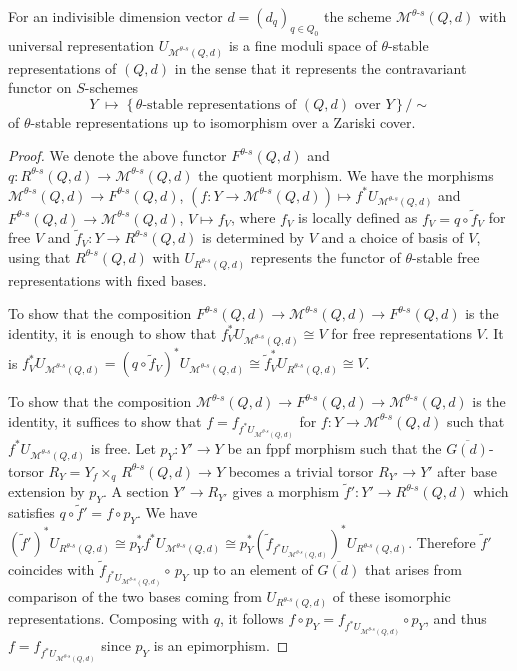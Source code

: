 \documentclass[ALCO,ThmDefs,Unicode,epreuves]{cedram}
\begin{document}
\begin{theo}\label{thm:modulireprquiver}
For an indivisible dimension vector $d=(d_q)_{q\in Q_0}$ the scheme 
$\mathcal M^{\theta\text{-}s}(Q,d)$ with universal representation 
$U_{\mathcal M^{\theta\text{-}s}(Q,d)}$ is a fine moduli space of $\theta$-stable 
representations of $(Q,d)$ in the sense that it represents the contravariant 
functor on $S$-schemes
\[
Y\;\mapsto\;
\big\{\text{$\,\theta$-stable representations of $(Q,d)$ over $Y\,$}\big\}\,/\!\sim
\]
of $\theta$-stable representations up to isomorphism over a Zariski cover.
\end{theo}
\begin{proof}
We denote the above functor $F^{\theta\text{-}s}(Q,d)$ and 
$q\colon R^{\theta\text{-}s}(Q,d)\to\mathcal M^{\theta\text{-}s}(Q,d)$
the quotient morphism.
We have the morphisms $\mathcal M^{\theta\text{-}s}(Q,d)\to 
F^{\theta\text{-}s}(Q,d)$, $(f\colon Y\to\mathcal M^{\theta\text{-}s}(Q,d))
\mapsto f^*U_{\mathcal M^{\theta\text{-}s}(Q,d)}$ 
and $F^{\theta\text{-}s}(Q,d)\to\mathcal M^{\theta\text{-}s}(Q,d)$,
$V\mapsto f_V$, where $f_V$ is locally defined as $f_V=q\circ\tilde{f}_V$ 
for free $V$ and $\tilde{f}_V\colon Y\to R^{\theta\text{-}s}(Q,d)$ is determined
by $V$ and a choice of basis of $V$, using that $R^{\theta\text{-}s}(Q,d)$ with
$U_{R^{\theta\text{-}s}(Q,d)}$ represents the functor of $\theta$-stable 
free representations with fixed bases.

To show that the composition 
$F^{\theta\text{-}s}(Q,d)\to\mathcal M^{\theta\text{-}s}(Q,d)
\to F^{\theta\text{-}s}(Q,d)$ is the identity, it is enough to show that 
$f_V^*U_{\mathcal M^{\theta\text{-}s}(Q,d)}\cong V$ for free representations $V$.
It is $f_V^*U_{\mathcal M^{\theta\text{-}s}(Q,d)}
=(q\circ \tilde{f}_V)^*U_{\mathcal M^{\theta\text{-}s}(Q,d)}
\cong\tilde{f}_V^*U_{R^{\theta\text{-}s}(Q,d)}\cong V$.

To show that the composition 
$\mathcal M^{\theta\text{-}s}(Q,d)\to F^{\theta\text{-}s}(Q,d)\to
\mathcal M^{\theta\text{-}s}(Q,d)$ is the identity,
it suffices to show that $f=f_{f^*U_{\mathcal M^{\theta\text{-}s}(Q,d)}}$
for $f\colon Y\to\mathcal M^{\theta\text{-}s}(Q,d)$ such that
$f^*U_{\mathcal M^{\theta\text{-}s}(Q,d)}$ is free.
Let $p_Y\colon Y'\to Y$ be an fppf morphism such that the $\overline{G(d)}$-torsor 
$R_Y=Y{}_f\!\!\times_q\,R^{\theta\text{-}s}(Q,d)\to Y$ becomes a trivial torsor 
$R_{Y'}\to Y'$ after base extension by $p_Y$. A section $Y'\to R_{Y'}$ gives a 
morphism $\tilde{f}'\colon Y'\to R^{\theta\text{-}s}(Q,d)$ which satisfies 
$q\circ\tilde{f}'=f\circ p_Y$.
We have $(\tilde{f}')^*U_{R^{\theta\text{-}s}(Q,d)}\cong
p_Y^*f^*U_{\mathcal M^{\theta\text{-}s}(Q,d)}\cong
p_Y^*(\tilde{f}_{f^*U_{\mathcal M^{\theta\text{-}s}(Q,d)}})^*
U_{R^{\theta\text{-}s}(Q,d)}$.
Therefore $\tilde{f}'$ coincides with 
$\tilde{f}_{f^*U_{\mathcal M^{\theta\text{-}s}(Q,d)}}\!\circ\,p_Y$
up to an element of $\overline{G(d)}$ that arises from comparison of
the two bases coming from $U_{R^{\theta\text{-}s}(Q,d)}$ of these isomorphic 
representations. Composing with $q$, it follows 
$f\circ p_Y=f_{f^*U_{\mathcal M^{\theta\text{-}s}(Q,d)}}\circ p_Y$,
and thus $f=f_{f^*U_{\mathcal M^{\theta\text{-}s}(Q,d)}}$ since 
$p_Y$ is an epimorphism.
\end{proof}
\end{document}
